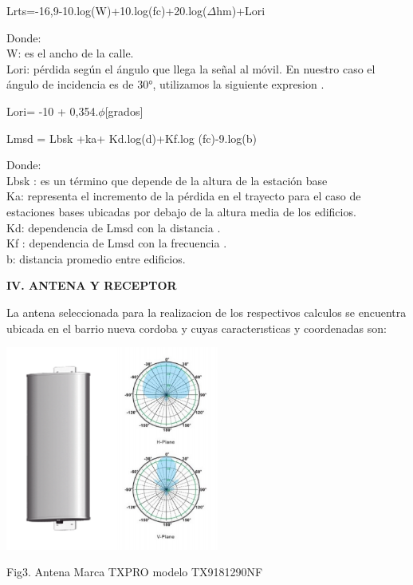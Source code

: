 \documentclass[10pt,a4paper]{article}
\begin{document}
\begin{multicols}{2}
\begin{center}
Lrts=-16,9-10.log(W)+10.log(fc)+20.log($\Delta $hm)+Lori
\end{center}
Donde:\\
W: es el ancho de la calle.\\
Lori: pérdida según el ángulo que llega la señal al móvil.
En nuestro caso el ángulo de incidencia es de  30°, utilizamos la siguiente expresion .\\
\begin{center}
Lori= -10 + 0,354.$\phi$[grados]
\end{center}
\begin{center}
Lmsd = Lbsk +ka+ Kd.log(d)+Kf.log (fc)-9.log(b)
\end{center}
Donde:\\
Lbsk : es un término que depende de la altura de la estación
base\\
Ka: representa el incremento de la pérdida en el trayecto
para el caso de estaciones bases ubicadas por debajo de la
altura media de los edificios.\\
Kd: dependencia de Lmsd con la distancia .\\
Kf : dependencia de Lmsd con la frecuencia . \\ 
b:  distancia promedio entre edificios. \\
\begin{center}
\textbf{IV. ANTENA Y RECEPTOR }
\end{center}

La antena seleccionada para la realizacion de los respectivos
calculos se encuentra ubicada en el barrio nueva cordoba y cuyas caracterısticas y coordenadas son: 


\begin{center}
\includegraphics[width=7cm]{image/ANTENA.PNG} 
\end{center}
\begin{center}
Fig3. Antena  Marca TXPRO modelo TX9181290NF
\end{center}



\end{multicols}
\end{document}
